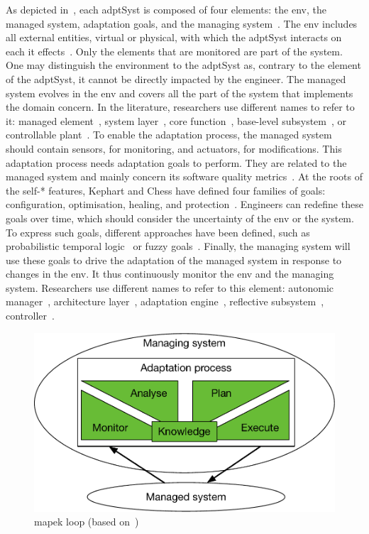 As depicted in~, each \gls{adptSyst} is composed of four elements: the \gls{env}, the managed system, adaptation goals, and the managing system~\cite{DBLP:books/sp/19/Weyns19}.
The \gls{env} includes all external entities, virtual or physical, with which the \gls{adptSyst} interacts on each it effects~\cite{DBLP:journals/ansoft/Jackson97}.
Only the elements that are monitored are part of the system.
One may distinguish the environment to the \gls{adptSyst} as, contrary to the element of the \gls{adptSyst}, it cannot be directly impacted by the engineer.
The managed system evolves in the \gls{env} and covers all the part of the system that implements the domain concern.
In the literature, researchers use different names to refer to it: managed element~\cite{DBLP:journals/computer/KephartC03}, system layer~\cite{DBLP:journals/computer/GarlanCHSS04}, core function~\cite{DBLP:journals/taas/SalehieT09}, base-level subsystem~\cite{DBLP:journals/taas/WeynsMA12}, or controllable plant~\cite{DBLP:conf/icse/FilieriHM14}.
To enable the adaptation process, the managed system should contain sensors, for monitoring, and actuators, for modifications.
This adaptation process needs adaptation goals to perform.
They are related to the managed system and mainly concern its software quality metrics~\cite{DBLP:conf/ecsa/WeynsA13}.
At the roots of the self-* features, Kephart and Chess have defined four families of goals: configuration, optimisation, healing, and protection~\cite{DBLP:journals/computer/KephartC03}.  
Engineers can redefine these goals over time, which should consider the uncertainty of the \gls{env} or the system.
To express such goals, different approaches have been defined, such as probabilistic temporal logic~\cite{DBLP:journals/tse/CalinescuGKMT11} or fuzzy goals~\cite{DBLP:conf/re/BaresiPS10}.
Finally, the managing system will use these goals to drive the adaptation of the managed system in response to changes in the \gls{env}.
It thus continuously monitor the \gls{env} and the managing system.
Researchers use different names to refer to this element: autonomic manager~\cite{DBLP:journals/computer/KephartC03}, architecture layer~\cite{DBLP:journals/computer/GarlanCHSS04}, adaptation engine~\cite{DBLP:journals/taas/SalehieT09}, reflective subsystem~\cite{DBLP:journals/taas/WeynsMA12}, controller~\cite{DBLP:conf/icse/FilieriHM14}.

\begin{figure}
	\centering
	\includegraphics[width=0.6\linewidth]{img/chapt-background/adptSyst/mapek}
	\caption{\gls{mapek} loop (based on~\cite{DBLP:journals/computer/KephartC03})}
	\label{fig:background:adptSyst:principles:mapek}
\end{figure}

